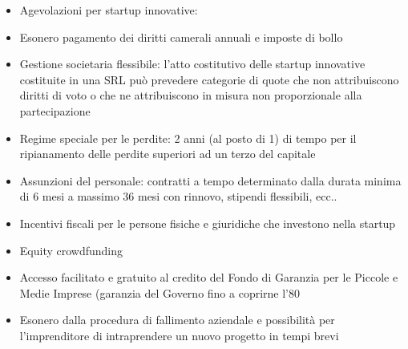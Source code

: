 \documentclass[10pt,a4paper,fleqn,oneside]{book}
\begin{document}
\begin{itemize}
    \item Agevolazioni per startup innovative:
    \item Esonero pagamento dei diritti camerali annuali e imposte di bollo
    \item Gestione societaria flessibile: l’atto costitutivo delle startup innovative costituite in
    una SRL può prevedere categorie di quote che non attribuiscono diritti di voto o che ne
    attribuiscono in misura non proporzionale alla partecipazione
    \item Regime speciale per le perdite: 2 anni (al posto di 1) di tempo per il ripianamento
    delle perdite superiori ad un terzo del capitale
    \item Assunzioni del personale: contratti a tempo determinato dalla durata minima di 6
    mesi a massimo 36 mesi con rinnovo, stipendi flessibili, ecc..
    \item Incentivi fiscali per le persone fisiche e giuridiche che investono nella startup
    \item Equity crowdfunding
    \item Accesso facilitato e gratuito al credito del Fondo di Garanzia per le Piccole e Medie
    Imprese (garanzia del Governo fino a coprirne l'80%
    \item Esonero dalla procedura di fallimento aziendale e possibilità per l'imprenditore di
    intraprendere un nuovo progetto in tempi brevi
\end{itemize}







\printglossaries
\end{document}
